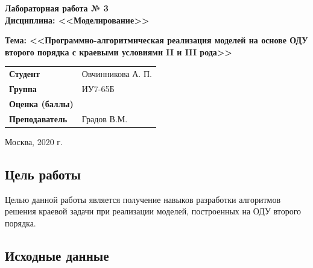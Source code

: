 \documentclass[a4paper,14pt]{article}
\begin{document}
\begin{titlepage}
    \vspace{3cm}

    \begin{center}
		\textbf{Лабораторная работа № 3} \\
		\textbf{Дисциплина: <<Моделирование>>}
        \vspace{0.5cm}
	\end{center}

	\begin{center}
		\textbf{Тема: <<Программно-алгоритмическая реализация моделей на основе ОДУ второго порядка с краевыми условиями II и  III рода>>}
        \vspace{0.5cm}
    \end{center}

    \vspace{2cm}

	\begin{flushleft}
        \begin{tabular}{ll}
            \textbf{Студент} & Овчинникова А. П. \\
            \textbf{Группа} & ИУ7-65Б \\
            \textbf{Оценка (баллы)} & \\
            \textbf{Преподаватель} & Градов В.М.   \\
        \end{tabular}
    \end{flushleft}

    \vspace{2cm}

   \begin{center}
        Москва, 2020 г.
    \end{center}

\end{titlepage}

\setcounter{page}{2}

\subsection*{Цель работы}

Целью данной работы является получение навыков разработки  алгоритмов решения краевой задачи при реализации моделей, 
построенных на  ОДУ второго порядка.

\subsection*{Исходные данные}
\end{document}
